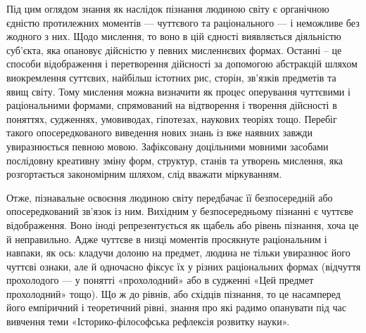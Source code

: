 Під цим оглядом знання як наслідок пізнання людиною світу є органічною
єдністю протилежних моментів --- чуттєвого та раціонального --- і неможливе без
жодного з них. Щодо мислення, то воно в цій єдності виявляється діяльністю
суб’єкта, яка опановує дійсністю у певних мисленнєвих формах. Останні – це
способи відображення і перетворення дійсності за допомогою абстракцій
шляхом виокремлення суттєвих, найбільш істотних рис, сторін, зв’язків
предметів та явищ світу. Тому мислення можна визначити як процес
оперування чуттєвими і раціональними формами, спрямований на відтворення і
творення дійсності в поняттях, судженнях, умовиводах, гіпотезах, наукових
теоріях тощо. Перебіг такого опосередкованого виведення нових знань із вже
наявних завжди увиразнюється певною мовою. Зафіксовану доцільними
мовними засобами послідовну креативну зміну форм, структур, станів та
утворень мислення, яка розгортається закономірним шляхом, слід вважати
міркуванням.

Отже, пізнавальне освоєння людиною світу передбачає її безпосередній або
опосередкований зв’язок із ним. Вихідним у безпосередньому пізнанні є
чуттєве відображення. Воно іноді репрезентується як щабель або рівень
пізнання, хоча це й неправильно. Адже чуттєве в низці моментів просякнуте
раціональним і навпаки, як ось: кладучи долоню на предмет, людина не тільки
увиразнює його чуттєві ознаки, але й одночасно фіксує їх у різних раціональних
формах (відчуття прохолодого --- у понятті «прохолодний» або в судженні «Цей
предмет прохолодний» тощо). Що ж до рівнів, або східців пізнання, то це
насамперед його емпіричний і теоретичний рівні, знання про які радимо
опанувати під час вивчення теми «Історико-філософська рефлексія розвитку
науки».

